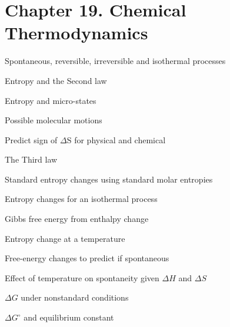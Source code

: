 \setcounter{section}{18}
\section{Chapter 19. Chemical Thermodynamics}
\secttoc

{\footnotesize \begin{multicols}{3}\begin{compactenum}
\item Spontaneous, reversible, irreversible and isothermal processes
\item Entropy and the Second law
\item Entropy and micro-states
\item Possible molecular motions
\item Predict sign of $\Delta$S for physical and chemical
\item The Third law
\item Standard entropy changes using standard molar entropies
\item Entropy changes for an isothermal process
\item Gibbs free energy from enthalpy change
\item Entropy change at a temperature
\item Free-energy changes to predict if spontaneous
\item Effect of temperature on spontaneity given $\Delta H$ and $\Delta S$
\item $\Delta G$ under nonstandard conditions
\item $\Delta G^\circ$ and equilibrium constant
\end{compactenum}\end{multicols}}


